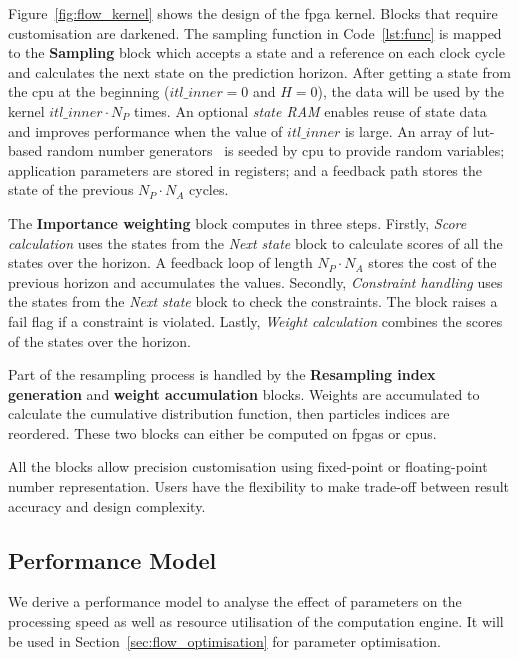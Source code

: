 Figure~\ref{fig:flow_kernel} shows the design of the \gls{fpga} kernel. Blocks that require customisation are darkened.
The sampling function in Code~\ref{lst:func} is mapped to the \textbf{Sampling} block which accepts a state and a reference on each clock cycle and calculates the next state on the prediction horizon.
After getting a state from the \gls{cpu} at the beginning ($itl\_inner=0$ and $H=0$), the data will be used by the kernel $itl\_inner \cdot N_P$ times.
An optional \textit{state RAM} enables reuse of state data and improves performance when the value of $itl\_inner$ is large.
An array of \gls{lut}-based random number generators~\cite{thomas07,thomas10} is seeded by \gls{cpu} to provide random variables; application parameters are stored in registers; and
a feedback path stores the state of the previous $N_P \cdot N_A$ cycles.

The \textbf{Importance weighting} block computes in three steps.
Firstly, \textit{Score calculation} uses the states from the \emph{Next state} block to calculate scores of all the states over the horizon.
A feedback loop of length $N_P \cdot N_A$ stores the cost of the previous horizon and accumulates the values.
Secondly, \textit{Constraint handling} uses the states from the \emph{Next state} block to check the constraints.
The block raises a fail flag if a constraint is violated.
Lastly, \textit{Weight calculation} combines the scores of the states over the horizon.

Part of the resampling process is handled by the \textbf{Resampling index generation} and \textbf{weight accumulation} blocks.
Weights are accumulated to calculate the cumulative distribution function, then particles indices are reordered.
These two blocks can either be computed on \glspl{fpga} or \glspl{cpu}.

All the blocks allow precision customisation using fixed-point or floating-point number representation.
Users have the flexibility to make trade-off between result accuracy and design complexity.


\subsection{Performance Model}
\label{sec:flow_model}

We derive a performance model to analyse the effect of parameters on the processing speed as well as resource utilisation of the computation engine.
It will be used in Section~\ref{sec:flow_optimisation} for parameter optimisation.

